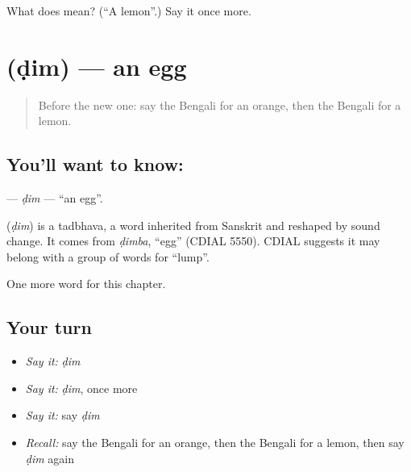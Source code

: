 \begin{tcolorbox}[breakable,colback=teal!4,colframe=teal!35!black,title={Before you move on}]
What does  mean? (\textquotedblleft{}A lemon\textquotedblright{}.) Say it once more.
\end{tcolorbox}
\section[\texorpdfstring{\bn{ডিম} (ḍim)}{ডিম (ḍim)}]{ (ḍim) — an egg}

\label{lesson:BN-C58-dim}



\begin{quote}
Before the new one: say the Bengali for an orange, then the Bengali for a lemon.
\end{quote}

\subsection*{You'll want to know: }
\textbf{} — \emph{ḍim} — \textquotedblleft{}an egg\textquotedblright{}.

\begin{cousinweb}
\textbf{} (\emph{ḍim}) is a tadbhava, a word inherited from Sanskrit and reshaped by sound change. It comes from \emph{ḍimba}, \textquotedblleft{}egg\textquotedblright{} (CDIAL 5550). CDIAL suggests it may belong with a group of words for \textquotedblleft{}lump\textquotedblright{}.
\end{cousinweb}

\begin{grammarlens}[title={What you've built}]
One more word for this chapter.
\end{grammarlens}

\subsection*{Your turn}
\begin{itemize}
\raggedright
  \item \emph{Say it:} \emph{ḍim}
  \item \emph{Say it:} \emph{ḍim}, once more
  \item \emph{Say it:} say \emph{ḍim}
  \item \emph{Recall:} say the Bengali for an orange, then the Bengali for a lemon, then say \emph{ḍim} again
\end{itemize}

